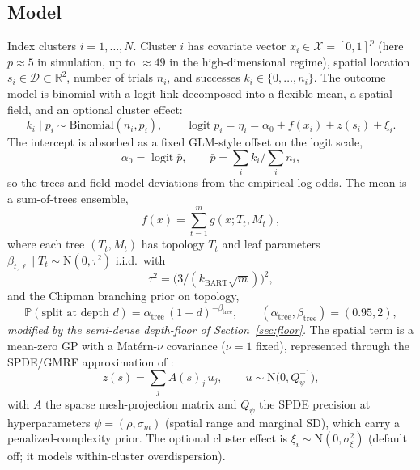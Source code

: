 \documentclass[11pt]{article}
\theoremstyle{remark}
\newcommand{\R}{\mathbb{R}}
\newcommand{\N}{\mathrm{N}}
\newcommand{\logit}{\operatorname{logit}}
\begin{document}
\subsection{Model}\label{sec:model}

Index clusters $i=1,\dots,N$. Cluster $i$ has covariate vector $x_i \in
\mathcal X=[0,1]^p$ (here $p\approx 5$ in simulation, up to $\approx 49$ in the
high-dimensional regime), spatial location $s_i \in \mathcal D \subset \R^2$,
number of trials $n_i$, and successes $k_i \in \{0,\dots,n_i\}$. The outcome model
is binomial with a logit link decomposed into a flexible mean, a spatial field,
and an optional cluster effect:
\begin{equation}\label{eq:outcome}
k_i \mid p_i \sim \mathrm{Binomial}(n_i,p_i), \qquad
\logit p_i = \eta_i = \alpha_0 + f(x_i) + z(s_i) + \xi_i .
\end{equation}
The intercept is absorbed as a fixed GLM-style offset on the logit scale,
\begin{equation}\label{eq:offset}
\alpha_0 = \logit \bar p, \qquad \bar p = \sum_i k_i \Big/ \sum_i n_i ,
\end{equation}
so the trees and field model deviations from the empirical log-odds. The mean is a
sum-of-trees ensemble,
\begin{equation}\label{eq:bart}
f(x) = \sum_{t=1}^{m} g(x;T_t,M_t),
\end{equation}
where each tree $(T_t,M_t)$ has topology $T_t$ and leaf parameters $\beta_{t,\ell}
\mid T_t \sim \N(0,\tau^2)$ i.i.d.\ with
\begin{equation}\label{eq:tau}
\tau^2 = \bigl(3/(k_{\mathrm{BART}}\sqrt m)\bigr)^2 ,
\end{equation}
and the Chipman branching prior on topology,
\begin{equation}\label{eq:chipman}
\mathbb P(\text{split at depth } d) = \alpha_{\mathrm{tree}}\,(1+d)^{-\beta_{\mathrm{tree}}},
\qquad (\alpha_{\mathrm{tree}},\beta_{\mathrm{tree}}) = (0.95,2),
\end{equation}
\emph{modified by the semi-dense depth-floor of Section~\ref{sec:floor}.} The
spatial term is a mean-zero GP with a Mat\'ern-$\nu$ covariance ($\nu=1$ fixed),
represented through the SPDE/GMRF approximation of \citet{lindgren2011spde}:
\begin{equation}\label{eq:spde}
z(s) = \sum_j A(s)_j\, u_j, \qquad u \sim \N\!\bigl(0, Q_\psi^{-1}\bigr),
\end{equation}
with $A$ the sparse mesh-projection matrix and $Q_\psi$ the SPDE precision at
hyperparameters $\psi=(\rho,\sigma_m)$ (spatial range and marginal SD), which
carry a penalized-complexity prior. The optional cluster effect is $\xi_i \sim
\N(0,\sigma^2_\xi)$ (default off; it models within-cluster overdispersion).
\end{document}
